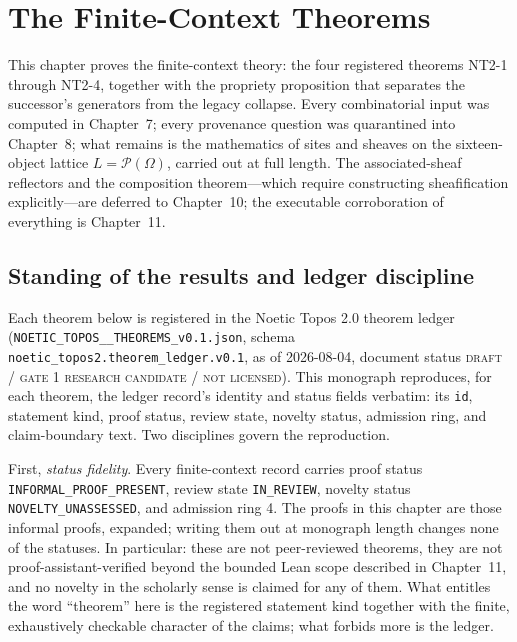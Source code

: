 \chapter{The Finite-Context Theorems}\label{ch09:main}

This chapter proves the finite-context theory: the four registered theorems NT2-1 through NT2-4, together with the propriety proposition that separates the successor's generators from the legacy collapse. Every combinatorial input was computed in Chapter~7; every provenance question was quarantined into Chapter~8; what remains is the mathematics of sites and sheaves on the sixteen-object lattice $L=\mathcal{P}(\Omega)$, carried out at full length. The associated-sheaf reflectors and the composition theorem---which require constructing sheafification explicitly---are deferred to Chapter~10; the executable corroboration of everything is Chapter~11.

\section{Standing of the results and ledger discipline}\label{ch09:sec-standing}

Each theorem below is registered in the Noetic Topos 2.0 theorem ledger (\texttt{NOETIC\_\allowbreak TOPOS\_\_\allowbreak THEOREMS\_\allowbreak v0.1.json}, schema \texttt{noetic\_\allowbreak topos2.\allowbreak theorem\_\allowbreak ledger.\allowbreak v0.1}, as of 2026-08-04, document status \textsc{draft / gate 1 research candidate / not licensed}). This monograph reproduces, for each theorem, the ledger record's identity and status fields verbatim: its \texttt{id}, statement kind, proof status, review state, novelty status, admission ring, and claim-boundary text. Two disciplines govern the reproduction.

First, \emph{status fidelity}. Every finite-context record carries proof status \texttt{INFORMAL\_PROOF\_PRESENT}, review state \texttt{IN\_REVIEW}, novelty status \texttt{NOVELTY\_UNASSESSED}, and admission ring 4. The proofs in this chapter are those informal proofs, expanded; writing them out at monograph length changes none of the statuses. In particular: these are not peer-reviewed theorems, they are not proof-assistant-verified beyond the bounded Lean scope described in Chapter~11, and no novelty in the scholarly sense is claimed for any of them. What entitles the word ``theorem'' here is the registered statement kind together with the finite, exhaustively checkable character of the claims; what forbids more is the ledger.

